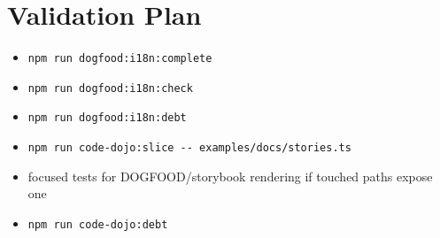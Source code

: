 \section{Validation Plan}\label{record-197-validation-plan}

\begin{itemize}
\tightlist
\item
  \texttt{n\allowbreak{}p\allowbreak{}m\allowbreak{} \allowbreak{}r\allowbreak{}u\allowbreak{}n\allowbreak{} \allowbreak{}d\allowbreak{}o\allowbreak{}g\allowbreak{}f\allowbreak{}o\allowbreak{}o\allowbreak{}d\allowbreak{}:\allowbreak{}i\allowbreak{}1\allowbreak{}8\allowbreak{}n\allowbreak{}:\allowbreak{}c\allowbreak{}o\allowbreak{}m\allowbreak{}p\allowbreak{}l\allowbreak{}e\allowbreak{}t\allowbreak{}e}
\item
  \texttt{n\allowbreak{}p\allowbreak{}m\allowbreak{} \allowbreak{}r\allowbreak{}u\allowbreak{}n\allowbreak{} \allowbreak{}d\allowbreak{}o\allowbreak{}g\allowbreak{}f\allowbreak{}o\allowbreak{}o\allowbreak{}d\allowbreak{}:\allowbreak{}i\allowbreak{}1\allowbreak{}8\allowbreak{}n\allowbreak{}:\allowbreak{}c\allowbreak{}h\allowbreak{}e\allowbreak{}c\allowbreak{}k}
\item
  \texttt{n\allowbreak{}p\allowbreak{}m\allowbreak{} \allowbreak{}r\allowbreak{}u\allowbreak{}n\allowbreak{} \allowbreak{}d\allowbreak{}o\allowbreak{}g\allowbreak{}f\allowbreak{}o\allowbreak{}o\allowbreak{}d\allowbreak{}:\allowbreak{}i\allowbreak{}1\allowbreak{}8\allowbreak{}n\allowbreak{}:\allowbreak{}d\allowbreak{}e\allowbreak{}b\allowbreak{}t}
\item
  \texttt{n\allowbreak{}p\allowbreak{}m\allowbreak{} \allowbreak{}r\allowbreak{}u\allowbreak{}n\allowbreak{} \allowbreak{}c\allowbreak{}o\allowbreak{}d\allowbreak{}e\allowbreak{}-\allowbreak{}d\allowbreak{}o\allowbreak{}j\allowbreak{}o\allowbreak{}:\allowbreak{}s\allowbreak{}l\allowbreak{}i\allowbreak{}c\allowbreak{}e\allowbreak{} \allowbreak{}-\allowbreak{}-\allowbreak{} \allowbreak{}e\allowbreak{}x\allowbreak{}a\allowbreak{}m\allowbreak{}p\allowbreak{}l\allowbreak{}e\allowbreak{}s\allowbreak{}/\allowbreak{}d\allowbreak{}o\allowbreak{}c\allowbreak{}s\allowbreak{}/\allowbreak{}s\allowbreak{}t\allowbreak{}o\allowbreak{}r\allowbreak{}i\allowbreak{}e\allowbreak{}s\allowbreak{}.\allowbreak{}t\allowbreak{}s}
\item
  focused tests for DOGFOOD/storybook rendering if touched paths expose one
\item
  \texttt{n\allowbreak{}p\allowbreak{}m\allowbreak{} \allowbreak{}r\allowbreak{}u\allowbreak{}n\allowbreak{} \allowbreak{}c\allowbreak{}o\allowbreak{}d\allowbreak{}e\allowbreak{}-\allowbreak{}d\allowbreak{}o\allowbreak{}j\allowbreak{}o\allowbreak{}:\allowbreak{}d\allowbreak{}e\allowbreak{}b\allowbreak{}t}

\end{itemize}
